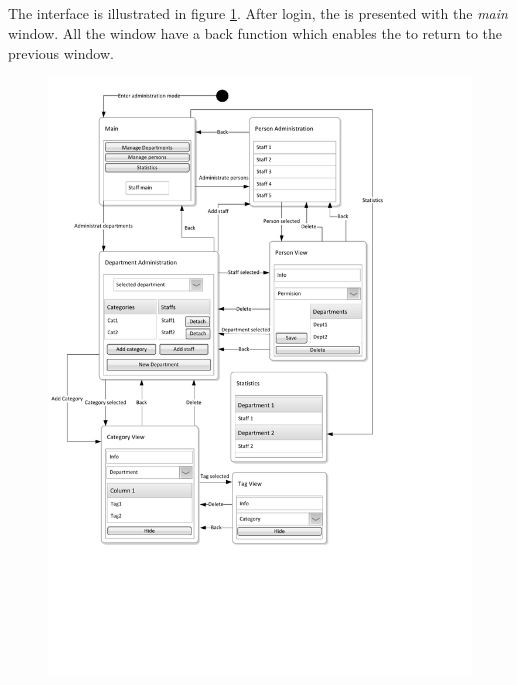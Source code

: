 \subsection{\ainterface}
\label{sec:admininterface}
The \admin[] interface is illustrated in figure \ref{fig:admin_interface}.
After login, the \admin[] is presented with the \textit{main} window. All the window have a back function which enables the \admin[] to return to the previous window.


\begin{figure}[p]
	\centering
		\includegraphics[width = \textwidth, clip=true, trim=0 4cm 5cm 0]{input/application_domain_analysis/Navigation_DiagramAdmin.pdf}
	\label{fig:admin_interface} %
\end{figure}

